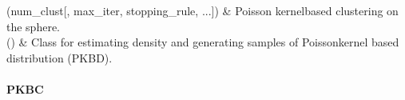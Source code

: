\documentclass[letterpaper,10pt,english,openany,oneside]{sphinxmanual}
\begin{document}
\begin{savenotes}\sphinxattablestart
\sphinxthistablewithglobalstyle
\sphinxthistablewithnovlinesstyle
\centering
\begin{tabulary}{\linewidth}[t]{}
\sphinxtoprule
\sphinxtableatstartofbodyhook
\sphinxAtStartPar
{\hyperref[\detokenize{api_reference/generated/QuadratiK.spherical_clustering.PKBC:QuadratiK.spherical_clustering.PKBC}]{}}(num\_clust{[}, max\_iter, stopping\_rule, ...{]})
&
\sphinxAtStartPar
Poisson kernel\sphinxhyphen{}based clustering on the sphere.
\\
\sphinxhline
\sphinxAtStartPar
{\hyperref[\detokenize{api_reference/generated/QuadratiK.spherical_clustering.PKBD:QuadratiK.spherical_clustering.PKBD}]{}}()
&
\sphinxAtStartPar
Class for estimating density and generating samples of Poisson\sphinxhyphen{}kernel based distribution (PKBD).
\\
\sphinxbottomrule
\end{tabulary}
\sphinxtableafterendhook\par
\sphinxattableend\end{savenotes}

\sphinxstepscope


\paragraph{PKBC}
\label{\detokenize{api_reference/generated/QuadratiK.spherical_clustering.PKBC:pkbc}}\label{\detokenize{api_reference/generated/QuadratiK.spherical_clustering.PKBC::doc}}
\end{document}
